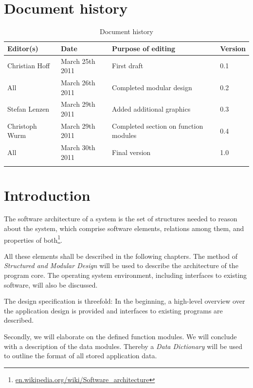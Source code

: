 


\maketitle
\newpage
\tableofcontents
\newpage

\setcounter{page}{4}

\chapter{Document history}
\begin{longtable}[c]{|p{}|p{}|p{}|p{}|}
\hline
Editor(s) & Date & Purpose of editing & Version\\
\hline
\hline
Christian Hoff & March 25th 2011 & First draft & 0.1 \\
All & March 26th 2011 & Completed modular design & 0.2 \\
Stefan Lenzen & March 29th 2011 & Added additional graphics & 0.3 \\
Christoph Wurm & March 29th 2011 & Completed section on function modules & 0.4 \\
All & March 30th 2011 & Final version & 1.0 \\
\hline
\caption{Document history}
\end{longtable}
\newpage
\chapter{Introduction}
The software architecture of a system is the set of structures needed to reason about the system, which comprise software elements, relations among them, and properties of both\footnote{\href{en.wikipedia.org/wiki/Software_architecture}{en.wikipedia.org/wiki/Software\_architecture}}.

All these elements shall be described in the following chapters. The method of \emph{Structured and Modular Design} will be used to describe the architecture of the program core. The operating system environment, including interfaces to existing software, will also be discussed.

The design specification is threefold: In the beginning, a high-level overview over the application design is provided and interfaces to existing programs are described.

Secondly, we will elaborate on the defined function modules. We will conclude with a description of the data modules. Thereby a \emph{Data Dictionary} will be used to outline the format of all stored application data.
\newpage
